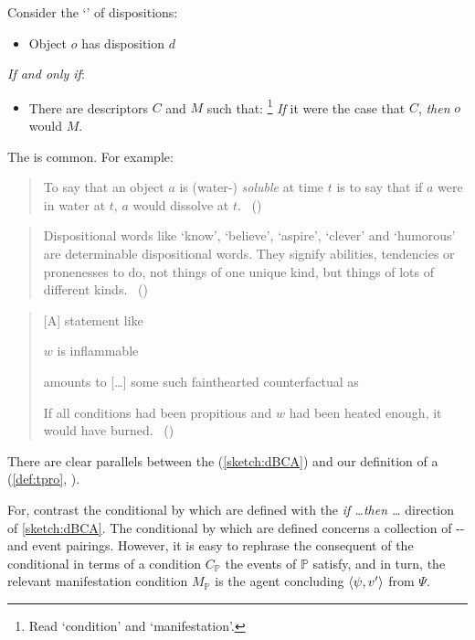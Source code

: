 \begin{note}
  Consider the `' of dispositions:%

  \begin{sketch}
    \label{sketch:dBCA}
    \vspace{-\baselineskip}
    \begin{itemize}
    \item
      Object \(o\) has disposition \(d\)
    \end{itemize}
    \emph{If and only if}:
    \begin{itemize}
    \item
      There are descriptors \(C\) and \(M\) such that:%
      \footnote{
        Read `condition' and `manifestation'.
      }
        \emph{If} it were the case that \(C\), \emph{then} \(o\) would \(M\).
    \end{itemize}
    \vspace{-\baselineskip}
  \end{sketch}

  \noindent%
  The  is common.
  For example:
  \begin{quote}
    To say that an object \(a\) is (water-) \emph{soluble} at time \(t\) is to say that if \(a\) were in water at \(t\), \(a\) would dissolve at \(t\).%
    \mbox{ }\hfill\mbox{(\cite[203]{Quine:2013aa})}
  \end{quote}
  \begin{quote}
    Dispositional words like `know', `believe', `aspire', `clever' and `humorous' are determinable dispositional words.
    They signify abilities, tendencies or pronenesses to do, not things of one unique kind, but things of lots of different kinds.%
    \mbox{ }\hfill\mbox{(\cite[118]{Ryle:1949aa})}
  \end{quote}
  \begin{quote}
    [A] statement like

    \(w\) is inflammable

    amounts to [\dots] some such fainthearted counterfactual as

    If all conditions had been propitious and \(w\) had been heated enough, it would have burned.\newline
    \mbox{ }\hfill\mbox{(\cite[39]{Goodman:1983aa})}
  \end{quote}
\end{note}

\begin{note}
  There are clear parallels between the  (\autoref{sketch:dBCA}) and our definition of a \tpro{} (\autoref{def:tpro}, ).

  For, contrast the conditional by which  are defined with the \emph{if \dots then \dots} direction of \autoref{sketch:dBCA}.
  The conditional by which  are defined concerns a collection of -- and event pairings.
  However, it is easy to rephrase the consequent of the conditional in terms of a condition \(C_{\mathbb{P}}\) the events of \(\mathbb{P}\) satisfy, and in turn, the relevant manifestation condition \(M_{\mathbb{P}}\) is the agent concluding \(\langle\psi, v'\rangle\) from \(\Psi\).
\end{note}



